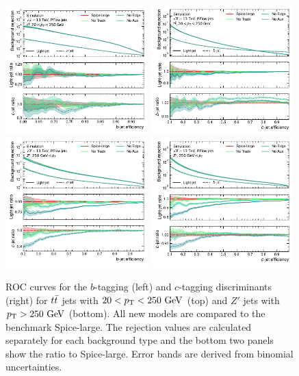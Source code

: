 \begin{figure}[ht]
    \centering
    \includegraphics[width=0.49\textwidth]{figures/flavour_tagging/b_roc_ttbar_aux.pdf}
    \includegraphics[width=0.49\textwidth]{figures/flavour_tagging/c_roc_ttbar_aux.pdf}
    \includegraphics[width=0.49\textwidth]{figures/flavour_tagging/b_roc_zprime_aux.pdf}
    \includegraphics[width=0.49\textwidth]{figures/flavour_tagging/c_roc_zprime_aux.pdf}
    \caption{ROC curves for the $b$-tagging (left) and $c$-tagging discriminants (right) for $t\bar{t}$ jets with $20 < \pt < 250~\GeV$ (top) and $Z'$ jets with $\pt > 250~\GeV$ (bottom).
        All new models are compared to the benchmark Spice-large. The rejection values are calculated separately for each background type and the bottom two panels show the ratio to Spice-large. Error bands are derived from binomial uncertainties.}
    \label{fig:auxiliary}
\end{figure}

